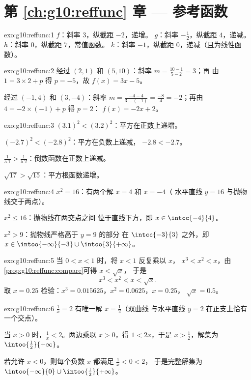 \section*{第 \ref{ch:g10:reffunc} 章 --- 参考函数}

\begin{solution}{exo:g10:reffunc:1}
$f$：斜率 $3$，纵截距 $-2$，递增。\quad
$g$：斜率 $-\frac12$，纵截距 $4$，递减。\quad
$h$：斜率 $0$，纵截距 $7$，常值函数。\quad
$k$：斜率 $-1$，纵截距 $0$，递减（且为线性函数）。
\end{solution}

\begin{solution}{exo:g10:reffunc:2}
经过 $(2,1)$ 和 $(5,10)$：斜率 $m = \frac{10 - 1}{5 - 2} = 3$；再
由 $1 = 3 \times 2 + p$ 得 $p = -5$，故 $f(x) = 3x - 5$。

经过 $(-1,4)$ 和 $(3,-4)$：斜率 $m = \frac{-4 - 4}{3 - (-1)} =
\frac{-8}{4} = -2$；再由 $4 = -2 \times (-1) + p$ 得 $p = 2$：
$f(x) = -2x + 2$。
\end{solution}

\begin{solution}{exo:g10:reffunc:3}
$(3.1)^2 < (3.2)^2$：平方在正数上递增。

$(-2.7)^2 < (-2.8)^2$：平方在负数上递减，
$-2.8 < -2.7$。

$\frac{1}{5.1} > \frac{1}{5.2}$：倒数函数在正数上递减。

$\sqrt{17} > \sqrt{15}$：平方根函数递增。
\end{solution}

\begin{solution}{exo:g10:reffunc:4}
$x^2 = 16$：有两个解 $x = 4$ 和 $x = -4$（
水平直线 $y = 16$ 与抛物线交于两点）。

$x^2 \leq 16$：抛物线在两交点之间
位于直线下方，即 $x \in \intcc{-4}{4}$。

$x^2 > 9$：抛物线严格高于 $y = 9$ 的部分
在 $\intcc{-3}{3}$ 之外，即 $x \in \intoo{-\infty}{-3} \cup \intoo{3}{+\infty}$。
\end{solution}

\begin{solution}{exo:g10:reffunc:5}
当 $0 < x < 1$ 时，将 $x < 1$ 反复乘以 $x$，
$x^3 < x^2 < x$，由\cref{prop:g10:reffunc:compare}可得 $x < \sqrt x$，
于是
\[
x^3 < x^2 < x < \sqrt x .
\]
取 $x = 0.25$ 检验：$x^3 = 0.015625$，$x^2 = 0.0625$，$x = 0.25$，
$\sqrt x = 0.5$。
\end{solution}

\begin{solution}{exo:g10:reffunc:6}
$\frac1x = 2$ 有唯一解 $x = \frac12$（双曲线
与水平直线 $y = 2$ 在正支上恰有一个交点）。

当 $x > 0$ 时，$\frac1x < 2$。两边乘以 $x > 0$，得 $1 < 2x$，于是
$x > \frac12$，解集为 $\intoo{\frac12}{+\infty}$。

若允许 $x < 0$，则每个负数 $x$ 都满足 $\frac1x < 0 < 2$，
于是完整解集为
$\intoo{-\infty}{0} \cup \intoo{\frac12}{+\infty}$。
\end{solution}

